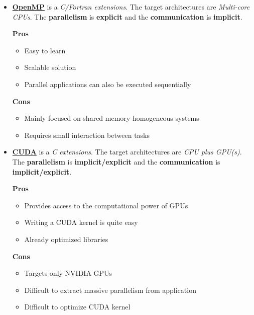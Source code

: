 \begin{itemize}
    \item \textbf{\underline{OpenMP}} is a \emph{C/Fortran extensions}. The target architectures are \emph{Multi-core CPUs}. The \textbf{parallelism} is \textbf{explicit} and the \textbf{communication} is \textbf{implicit}.
    \begin{flushleft}
        \textcolor{Green3}{ \textbf{Pros}}
    \end{flushleft}
    \begin{itemize}
        \item Easy to learn
        \item Scalable solution
        \item Parallel applications can also be executed sequentially
    \end{itemize}
    \begin{flushleft}
        \textcolor{Red2}{ \textbf{Cons}}
    \end{flushleft}
    \begin{itemize}
        \item Mainly focused on shared memory homogeneous systems
        \item Requires small interaction between tasks
    \end{itemize}

    \item \textbf{\underline{CUDA}} is a \emph{C extensions}. The target architectures are \emph{CPU plus GPU(s)}. The \textbf{parallelism} is \textbf{implicit/explicit} and the \textbf{communication} is \textbf{implicit/explicit}.
    \begin{flushleft}
        \textcolor{Green3}{ \textbf{Pros}}
    \end{flushleft}
    \begin{itemize}
        \item Provides access to the computational power of GPUs
        \item Writing a CUDA kernel is quite easy
        \item Already optimized libraries
    \end{itemize}
    \begin{flushleft}
        \textcolor{Red2}{ \textbf{Cons}}
    \end{flushleft}
    \begin{itemize}
        \item Targets only NVIDIA GPUs
        \item Difficult to extract massive parallelism from application
        \item Difficult to optimize CUDA kernel
    \end{itemize}


\end{itemize}
